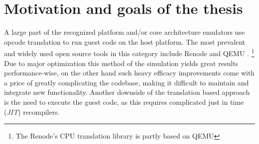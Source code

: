 \section{Motivation and goals of the thesis}

A large part of the recognized platform and/or core architecture emulators use opcode translation to run guest code
on the host platform. The most prevalent and widely used open source tools in this category include Renode \cite{Renode}
and QEMU \cite{Qemu}.%
\footnote{The Renode's CPU translation library is partly based on QEMU}
Due to major optimization this method of the simulation yields great results performance-wise, on the other hand
such heavy efficacy improvements come with a price of greatly complicating the codebase, making it difficult
to maintain and integrate new functionality. Another downside of the translation based approach is the need
to execute the guest code, as this requires complicated just in time (\textit{JIT}) recompilers.

